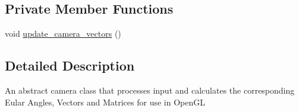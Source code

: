 \subsection*{Private Member Functions}
\begin{DoxyCompactItemize}
\item 
void \hyperlink{classCamera_ad9745a585d867bc34439c36f0a6d66a1}{update\-\_\-camera\-\_\-vectors} ()
\end{DoxyCompactItemize}


\subsection{Detailed Description}
An abstract camera class that processes input and calculates the corresponding Eular Angles, Vectors and Matrices for use in Open\-G\-L 

